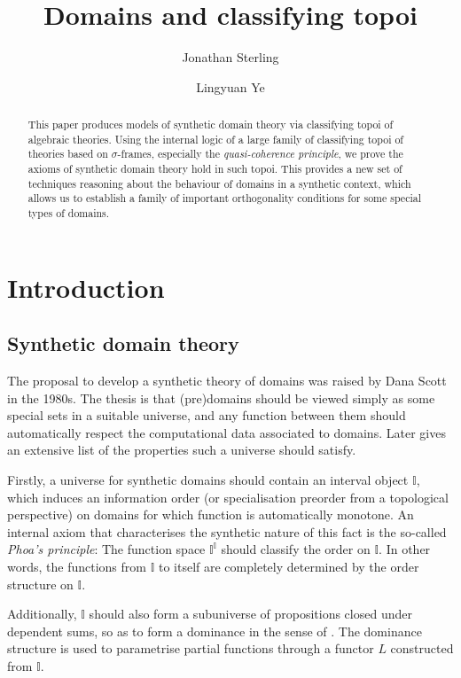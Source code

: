 \documentclass[a4paper,12pt]{amsart}
\title{Domains and classifying topoi}
\author{Jonathan Sterling}
\author{Lingyuan Ye}
\theoremstyle{definition}
\newcommand{\mbb}[1]{\mathbb{#1}}
\newcommand{\I}{\mbb I}
\begin{document}
\begin{abstract}
  This paper produces models of synthetic domain theory via classifying topoi of algebraic theories. Using the internal logic of a large family of classifying topoi of theories based on $\sigma$-frames, especially the \emph{quasi-coherence principle}, we prove the axioms of synthetic domain theory hold in such topoi. This provides a new set of techniques reasoning about the behaviour of domains in a synthetic context, which allows us to establish a family of important orthogonality conditions for some special types of domains.
\end{abstract}

\maketitle


\section{Introduction}\label{sec:intro}

\subsection{Synthetic domain theory}\label{subsec:sdt}

The proposal to develop a synthetic theory of domains was raised by Dana Scott in the 1980s. The thesis is that (pre)domains should be viewed simply as some special sets in a suitable universe, and any function between them should automatically respect the computational data associated to domains. Later \citet{hyland1990first} gives an extensive list of the properties such a universe should satisfy.

Firstly, a universe for synthetic domains should contain an interval object $\I$, which induces an information order (or specialisation preorder from a topological perspective) on domains for which function is automatically monotone. An internal axiom that characterises the synthetic nature of this fact is the so-called \emph{Phoa's principle}: The function space $\I^\I$ should classify the order on $\I$. In other words, the functions from $\I$ to itself are completely determined by the order structure on $\I$. 

Additionally, $\I$ should also form a subuniverse of propositions closed under dependent sums, so as to form a dominance in the sense of \citet{rosolini1986continuity}. The dominance structure is used to parametrise partial functions through a functor $L$ constructed from $\I$. 
\end{document}
